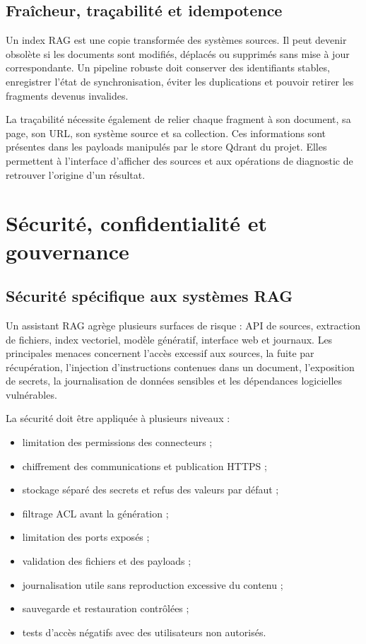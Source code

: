\subsection{Fraîcheur, traçabilité et idempotence}

Un index RAG est une copie transformée des systèmes sources. Il peut devenir obsolète si les documents sont modifiés, déplacés ou supprimés sans mise à jour correspondante. Un pipeline robuste doit conserver des identifiants stables, enregistrer l'état de synchronisation, éviter les duplications et pouvoir retirer les fragments devenus invalides.

La traçabilité nécessite également de relier chaque fragment à son document, sa page, son URL, son système source et sa collection. Ces informations sont présentes dans les payloads manipulés par le store Qdrant du projet. Elles permettent à l'interface d'afficher des sources et aux opérations de diagnostic de retrouver l'origine d'un résultat.

\section{Sécurité, confidentialité et gouvernance}

\subsection{Sécurité spécifique aux systèmes RAG}

Un assistant RAG agrège plusieurs surfaces de risque : API de sources, extraction de fichiers, index vectoriel, modèle génératif, interface web et journaux. Les principales menaces concernent l'accès excessif aux sources, la fuite par récupération, l'injection d'instructions contenues dans un document, l'exposition de secrets, la journalisation de données sensibles et les dépendances logicielles vulnérables.

La sécurité doit être appliquée à plusieurs niveaux :

\begin{itemize}
    \item limitation des permissions des connecteurs ;
    \item chiffrement des communications et publication HTTPS ;
    \item stockage séparé des secrets et refus des valeurs par défaut ;
    \item filtrage ACL avant la génération ;
    \item limitation des ports exposés ;
    \item validation des fichiers et des payloads ;
    \item journalisation utile sans reproduction excessive du contenu ;
    \item sauvegarde et restauration contrôlées ;
    \item tests d'accès négatifs avec des utilisateurs non autorisés.
\end{itemize}

